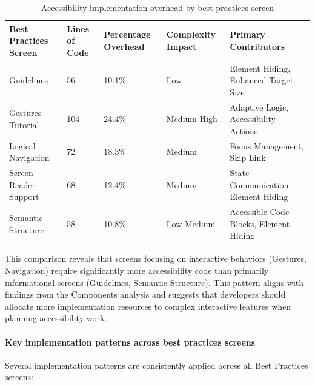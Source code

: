 \begin{table}[ht]
\caption{Accessibility implementation overhead by best practices screen}
\label{tab:best_practices_comparative_overhead}
\centering
\begin{tabular}[c]{|C{2.5cm}|C{2cm}|C{2.8cm}|C{2.8cm}|C{4.5cm}|}
\hline
\textbf{Best Practices Screen} & \textbf{Lines of Code} & \textbf{Percentage Overhead} & \textbf{Complexity Impact} & \textbf{Primary Contributors} \\
\hline
Guidelines & 56 & 10.1\% & Low & Element Hiding, Enhanced Target Size \\
\hline
Gestures Tutorial & 104 & 24.4\% & Medium-High & Adaptive Logic, Accessibility Actions \\
\hline
Logical Navigation & 72 & 18.3\% & Medium & Focus Management, Skip Link \\
\hline
Screen Reader Support & 68 & 12.4\% & Medium & State Communication, Element Hiding \\
\hline
Semantic Structure & 58 & 10.8\% & Low-Medium & Accessible Code Blocks, Element Hiding \\
\hline
\end{tabular}
\end{table}
\FloatBarrier

This comparison reveals that screens focusing on interactive behaviors (Gestures, Navigation) require significantly more accessibility code than primarily informational screens (Guidelines, Semantic Structure). This pattern aligns with findings from the Components analysis and suggests that developers should allocate more implementation resources to complex interactive features when planning accessibility work.

\paragraph{Key implementation patterns across best practices screens}

Several implementation patterns are consistently applied across all Best Practices screens:

